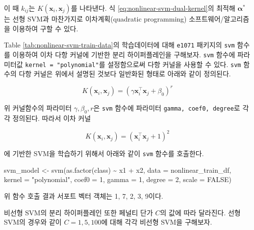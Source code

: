 \documentclass[
]{book}
\newenvironment{Shaded}{\begin{snugshade}}{\end{snugshade}}
\newcommand{\AttributeTok}[1]{\textcolor[rgb]{0.77,0.63,0.00}{#1}}
\newcommand{\ConstantTok}[1]{\textcolor[rgb]{0.00,0.00,0.00}{#1}}
\newcommand{\DecValTok}[1]{\textcolor[rgb]{0.00,0.00,0.81}{#1}}
\newcommand{\FunctionTok}[1]{\textcolor[rgb]{0.00,0.00,0.00}{#1}}
\newcommand{\NormalTok}[1]{#1}
\newcommand{\OtherTok}[1]{\textcolor[rgb]{0.56,0.35,0.01}{#1}}
\newcommand{\SpecialCharTok}[1]{\textcolor[rgb]{0.00,0.00,0.00}{#1}}
\newcommand{\StringTok}[1]{\textcolor[rgb]{0.31,0.60,0.02}{#1}}
\begin{document}
이 때 \(k_{ij}\)는 \(K(\mathbf{x}_i, \mathbf{x}_j)\)를 나타낸다. 식 \eqref{eq:nonlinear-svm-dual-kernel}의 최적해 \(\boldsymbol\alpha^*\)는 선형 SVM과 마찬가지로 이차계획(quadratic programming) 소프트웨어/알고리즘을 이용하여 구할 수 있다.

Table \ref{tab:nonlinear-svm-train-data}의 학습데이터에 대해 \texttt{e1071} 패키지의 \texttt{svm} 함수를 이용하여 이차 다항 커널에 기반한 분리 하이퍼플레인을 구해보자. \texttt{svm} 함수에 파라미터값 \texttt{kernel\ =\ "polynomial"}를 설정함으로써 다항 커널을 사용할 수 있다. \texttt{svm} 함수의 다항 커널은 위에서 설명된 것보다 일반화된 형태로 아래와 같이 정의된다.

\begin{equation*}
K(\mathbf{x}_i, \mathbf{x}_j) = \left( \gamma \mathbf{x}_i^\top \mathbf{x}_j + \beta_0 \right)^r
\end{equation*}

위 커널함수의 파라미터 \(\gamma, \beta_0, r\)은 \texttt{svm} 함수에 파라미터 \texttt{gamma,\ coef0,\ degree}로 각각 정의된다. 따라서 이차 커널

\begin{equation*}
K(\mathbf{x}_i, \mathbf{x}_j) = \left( \mathbf{x}_i^\top \mathbf{x}_j + 1 \right)^2
\end{equation*}

에 기반한 SVM을 학습하기 위해서 아래와 같이 \texttt{svm} 함수를 호출한다.

\begin{Shaded}
\begin{Highlighting}[]
\NormalTok{svm\_model }\OtherTok{\textless{}{-}} \FunctionTok{svm}\NormalTok{(}\FunctionTok{as.factor}\NormalTok{(class) }\SpecialCharTok{\textasciitilde{}}\NormalTok{ x1 }\SpecialCharTok{+}\NormalTok{ x2, }\AttributeTok{data =}\NormalTok{ nonlinear\_train\_df, }
                 \AttributeTok{kernel =} \StringTok{"polynomial"}\NormalTok{, }\AttributeTok{coef0 =} \DecValTok{1}\NormalTok{, }\AttributeTok{gamma =} \DecValTok{1}\NormalTok{, }\AttributeTok{degree =} \DecValTok{2}\NormalTok{,}
                 \AttributeTok{scale =} \ConstantTok{FALSE}\NormalTok{)}
\end{Highlighting}
\end{Shaded}

위 함수 호출 결과 서포트 벡터 객체는 1, 7, 2, 3, 9이다.

비선형 SVM의 분리 하이퍼플레인 또한 페널티 단가 \(C\)의 값에 따라 달라진다. 선형 SVM의 경우와 같이 \(C = 1, 5, 100\)에 대해 각각 비선형 SVM을 구해보자.
\end{document}
